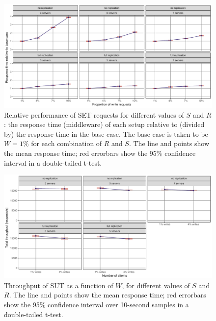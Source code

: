 \documentclass[11pt]{article}
\begin{document}
\begin{figure}[h]
\centering
\includegraphics[width=\textwidth]{../results/writes/graphs/relative_performance_set.pdf}
\caption{Relative performance of SET requests for different values of $S$ and $R$: the response time (middleware) of each setup relative to (divided by) the response time in the base case. The base case is taken to be $W=1\%$ for each combination of $R$ and $S$.
The line and points show the mean response time; red errorbars show the 95\% confidence interval in a double-tailed t-test.}
\label{fig:exp3:res:relative:set}
\end{figure}

\begin{figure}[h]
\centering
\includegraphics[width=\textwidth]{../results/writes/graphs/throughput_vs_writes.pdf}
\caption{Throughput of SUT as a function of $W$, for different values of $S$ and $R$. The line and points show the mean response time; red errorbars show the 95\% confidence interval over 10-second samples in a double-tailed t-test.}
\label{fig:exp3:res:throughput}
\end{figure}
\end{document}
